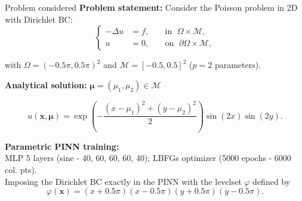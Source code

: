 \begin{frame}{Problem considered} 
	\textbf{Problem statement:} Consider the Poisson problem in 2D with Dirichlet BC:
	\vspace{-5pt}
	\begin{equation*}
		\left\{
		\begin{aligned}
			-\Delta u & = f, \; &  & \text{in } \; \Omega \times \mathcal{M}, \\
			u         & =0, \;  &  & \text{on } \; \partial\Omega \times \mathcal{M},
		\end{aligned}
		\right.
	\end{equation*}

	\vspace{-5pt}
	with $\Omega=(-0.5 \pi, 0.5 \pi)^2$ and $\mathcal{M}=[-0.5,0.5]^2$ ($p=2$ parameters).
		
	\vspace{8pt}
	\textbf{Analytical solution:} $\bm{\mu}=(\mu_1,\mu_2) \in \mathcal{M}$

	\vspace{-5pt}
	\begin{equation*}
		u(\bm{x},\bm{\mu})=\exp\left(-\frac{(x-\mu_1)^2+(y-\mu_2)^2}{2}\right)\sin(2 x)\sin(2 y).
	\end{equation*}

	\vspace{12pt}
	\textbf{Parametric PINN training:} \\
	MLP 5 layers (sine - 40, 60, 60, 60, 40); LBFGs optimizer (5000 epochs - 6000 col. pts). \\
	Imposing the Dirichlet BC exactly in the PINN with the levelset $\varphi$ defined by
	$$\varphi(\bm{x})=(x+0.5\pi)(x-0.5\pi)(y+0.5\pi)(y-0.5\pi).$$
\end{frame}

